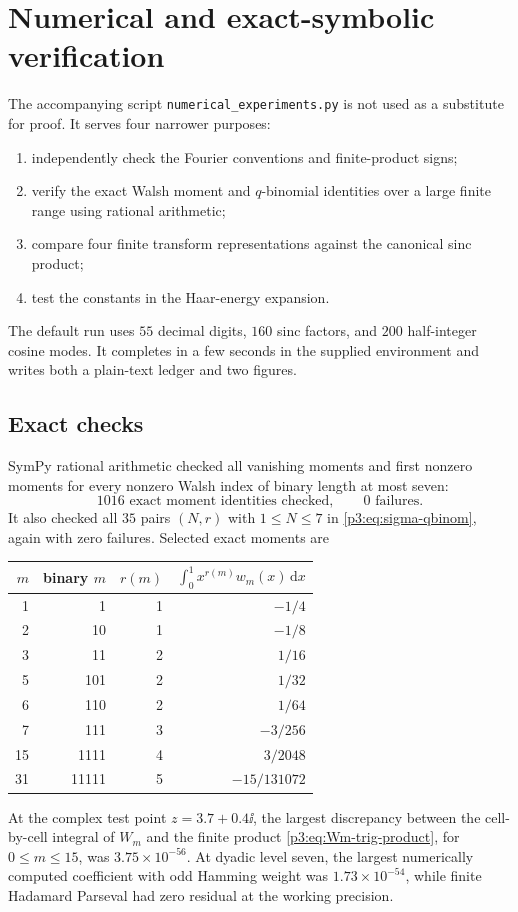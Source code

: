 \documentclass[11pt]{article}
\theoremstyle{definition}
\theoremstyle{remark}
\newcommand{\dd}{\,\mathrm d}
\begin{document}
\section{Numerical and exact-symbolic verification}
\label{p3:sec:numerics}

The accompanying script \texttt{numerical\_experiments.py} is not used as a
substitute for proof.  It serves four narrower purposes:
\begin{enumerate}
\item independently check the Fourier conventions and finite-product signs;
\item verify the exact Walsh moment and $q$-binomial identities over a large
      finite range using rational arithmetic;
\item compare four finite transform representations against the canonical sinc
      product;
\item test the constants in the Haar-energy expansion.
\end{enumerate}
The default run uses $55$ decimal digits, $160$ sinc factors, and $200$
half-integer cosine modes.  It completes in a few seconds in the supplied
environment and writes both a plain-text ledger and two figures.

\subsection{Exact checks}

SymPy rational arithmetic checked all vanishing moments and first nonzero
moments for every nonzero Walsh index of binary length at most seven:
\begin{equation}\label{p3:eq:numerical-Walsh-count}
 1016\text{ exact moment identities checked},\qquad0\text{ failures}.
\end{equation}
It also checked all $35$ pairs $(N,r)$ with $1\le N\le7$ in
\eqref{p3:eq:sigma-qbinom}, again with zero failures.  Selected exact moments are
\begin{center}
\begin{tabular}{@{}rrrr@{}}
\toprule
$m$ & binary $m$ & $r(m)$ & $\int_0^1x^{r(m)}w_m(x)\dd x$\\
\midrule
1  & 1     & 1 & $-1/4$\\
2  & 10    & 1 & $-1/8$\\
3  & 11    & 2 & $1/16$\\
5  & 101   & 2 & $1/32$\\
6  & 110   & 2 & $1/64$\\
7  & 111   & 3 & $-3/256$\\
15 & 1111  & 4 & $3/2048$\\
31 & 11111 & 5 & $-15/131072$\\
\bottomrule
\end{tabular}
\end{center}
At the complex test point $z=3.7+0.4\ii$, the largest discrepancy between the
cell-by-cell integral of $W_m$ and the finite product
\eqref{p3:eq:Wm-trig-product}, for $0\le m\le15$, was
$3.75\times10^{-56}$.  At dyadic level seven, the largest numerically computed
coefficient with odd Hamming weight was $1.73\times10^{-54}$, while finite
Hadamard Parseval had zero residual at the working precision.
\end{document}
